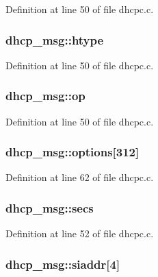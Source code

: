 Definition at line 50 of file dhcpc.c.

\hypertarget{structdhcp__msg_a5c9e4bb2f8935edecc1a8e33e6a0cf83}{
\subsubsection[{htype}]{ {\bf dhcp\_\-msg::htype}}}
\label{structdhcp__msg_a5c9e4bb2f8935edecc1a8e33e6a0cf83}


Definition at line 50 of file dhcpc.c.

\hypertarget{structdhcp__msg_aad49609161e8b9b337bc6af49430368b}{
\subsubsection[{op}]{ {\bf dhcp\_\-msg::op}}}
\label{structdhcp__msg_aad49609161e8b9b337bc6af49430368b}


Definition at line 50 of file dhcpc.c.

\hypertarget{structdhcp__msg_aef4fc68ee8cf7301239b23027981d4a6}{
\subsubsection[{options}]{ {\bf dhcp\_\-msg::options}\mbox{[}312\mbox{]}}}
\label{structdhcp__msg_aef4fc68ee8cf7301239b23027981d4a6}


Definition at line 62 of file dhcpc.c.

\hypertarget{structdhcp__msg_ab1a8469d961aee2dca25c832f5f0042c}{
\subsubsection[{secs}]{ {\bf dhcp\_\-msg::secs}}}
\label{structdhcp__msg_ab1a8469d961aee2dca25c832f5f0042c}


Definition at line 52 of file dhcpc.c.

\hypertarget{structdhcp__msg_aa67d35a840892c0586d4201ebb7c83c1}{
\subsubsection[{siaddr}]{ {\bf dhcp\_\-msg::siaddr}\mbox{[}4\mbox{]}}}
\label{structdhcp__msg_aa67d35a840892c0586d4201ebb7c83c1}



